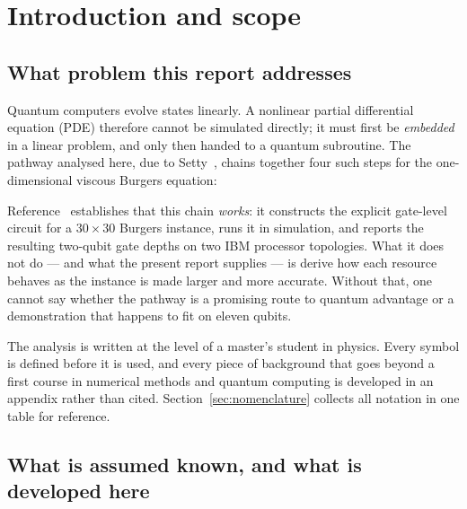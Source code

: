 \documentclass[11pt,a4paper]{article}
\theoremstyle{plain}
\theoremstyle{definition}
\theoremstyle{remark}
\begin{document}
\tableofcontents

\section{Introduction and scope}

\subsection{What problem this report addresses}

Quantum computers evolve states linearly.  A nonlinear partial differential
equation (PDE) therefore cannot be simulated directly; it must first be
\emph{embedded} in a linear problem, and only then handed to a quantum
subroutine.  The pathway analysed here, due to Setty~\cite{Setty2026}, chains
together four such steps for the one-dimensional viscous Burgers equation:

\begin{center}
\end{center}

Reference~\cite{Setty2026} establishes that this chain \emph{works}: it
constructs the explicit gate-level circuit for a $30\times30$ Burgers instance,
runs it in simulation, and reports the resulting two-qubit gate depths on two
IBM processor topologies.  What it does not do --- and what the present report
supplies --- is derive how each resource behaves as the instance is made larger
and more accurate.  Without that, one cannot say whether the pathway is a
promising route to quantum advantage or a demonstration that happens to fit on
eleven qubits.

The analysis is written at the level of a master's student in physics.  Every
symbol is defined before it is used, and every piece of background that goes
beyond a first course in numerical methods and quantum computing is developed in
an appendix rather than cited.  Section~\ref{sec:nomenclature} collects all
notation in one table for reference.

\subsection{What is assumed known, and what is developed here}
\end{document}
